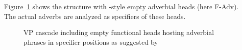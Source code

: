 Figure~\ref{fig-Cinque-AdvP-VP-selection} shows the structure with \citeauthor{Cinque99a-u}-style
empty adverbial heads (here F-Adv). The actual adverbs are analyzed as specifiers of these heads.
\begin{figure}[htb]
\caption{VP cascade including empty functional heads hosting adverbial phrases in specifier positions
  as suggested by \citet{Cinque99a-u}}\label{fig-Cinque-AdvP-VP-selection}
\end{figure}

